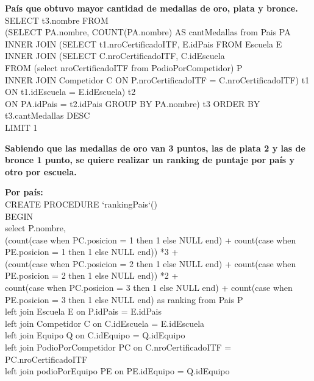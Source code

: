 \begin{itemize}
\item{\textbf{País que obtuvo mayor cantidad de medallas de oro, plata y bronce.}\\
SELECT t3.nombre FROM\\
(SELECT PA.nombre, COUNT(PA.nombre) AS cantMedallas from Pais PA\\
INNER JOIN (SELECT t1.nroCertificadoITF, E.idPais FROM Escuela E\\
INNER JOIN (SELECT C.nroCertificadoITF, C.idEscuela\\
FROM (select nroCertificadoITF from PodioPorCompetidor) P \\
INNER JOIN Competidor C ON P.nroCertificadoITF = C.nroCertificadoITF) t1\\
ON t1.idEscuela = E.idEscuela) t2\\
ON PA.idPais = t2.idPais GROUP BY PA.nombre) t3 ORDER BY t3.cantMedallas DESC\\
LIMIT 1\;\\
}
\item{\textbf{Sabiendo que las medallas de oro van 3 puntos, las de plata 2 y las de bronce 1 punto, se quiere realizar un ranking de puntaje por país y otro por escuela.}
\item \textbf{Por país:}\\
CREATE PROCEDURE `rankingPais`()\\
BEGIN\\
select P.nombre,\\
	(count(case when PC.posicion = 1 then 1 else NULL end) + count(case when PE.posicion = 1 then 1 else NULL end)) *3 + \\
	(count(case when PC.posicion = 2 then 1 else NULL end) + count(case when PE.posicion = 2 then 1 else NULL end)) *2 + \\
    count(case when PC.posicion = 3 then 1 else NULL end) + count(case when PE.posicion = 3 then 1 else NULL end) as ranking
    from Pais P\\
		left join Escuela E on P.idPais = E.idPais\\
		left join Competidor C on C.idEscuela = E.idEscuela\\
		left join Equipo Q on C.idEquipo = Q.idEquipo\\
		left join PodioPorCompetidor PC on C.nroCertificadoITF = PC.nroCertificadoITF\\
		left join podioPorEquipo PE on PE.idEquipo = Q.idEquipo\\
		
}
\end{itemize}

